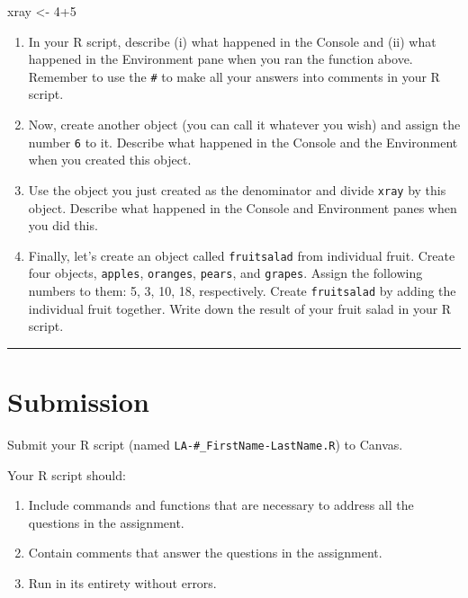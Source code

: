 \documentclass[
]{article}
\newenvironment{Shaded}{\begin{snugshade}}{\end{snugshade}}
\newcommand{\DecValTok}[1]{\textcolor[rgb]{0.68,0.00,0.00}{#1}}
\newcommand{\NormalTok}[1]{\textcolor[rgb]{0.00,0.23,0.31}{#1}}
\newcommand{\OtherTok}[1]{\textcolor[rgb]{0.00,0.23,0.31}{#1}}
\newcommand{\SpecialCharTok}[1]{\textcolor[rgb]{0.37,0.37,0.37}{#1}}
\providecommand{\tightlist}{%
  \setlength{\itemsep}{0pt}\setlength{\parskip}{0pt}}
\begin{document}
\begin{Shaded}
\begin{Highlighting}[]
\NormalTok{xray }\OtherTok{\textless{}{-}} \DecValTok{4}\SpecialCharTok{+}\DecValTok{5}
\end{Highlighting}
\end{Shaded}

\begin{enumerate}
\def\labelenumi{\arabic{enumi})}
\setcounter{enumi}{1}
\item
  In your R script, describe (i) what happened in the Console and (ii)
  what happened in the Environment pane when you ran the function above.
  Remember to use the \texttt{\#} to make all your answers into comments
  in your R script.
\item
  Now, create another object (you can call it whatever you wish) and
  assign the number \texttt{6} to it. Describe what happened in the
  Console and the Environment when you created this object.
\item
  Use the object you just created as the denominator and divide
  \texttt{xray} by this object. Describe what happened in the Console
  and Environment panes when you did this.
\item
  Finally, let's create an object called \texttt{fruitsalad} from
  individual fruit. Create four objects, \texttt{apples},
  \texttt{oranges}, \texttt{pears}, and \texttt{grapes}. Assign the
  following numbers to them: 5, 3, 10, 18, respectively. Create
  \texttt{fruitsalad} by adding the individual fruit together. Write
  down the result of your fruit salad in your R script.
\end{enumerate}

\begin{center}\rule{0.5\linewidth}{0.5pt}\end{center}

\section{Submission}\label{submission}

Submit your R script (named \texttt{LA-\#\_FirstName-LastName.R}) to
Canvas.

Your R script should:

\begin{enumerate}
\def\labelenumi{\arabic{enumi})}
\tightlist
\item
  Include commands and functions that are necessary to address all the
  questions in the assignment.
\item
  Contain comments that answer the questions in the assignment.
\item
  Run in its entirety without errors.
\end{enumerate}
\end{document}
